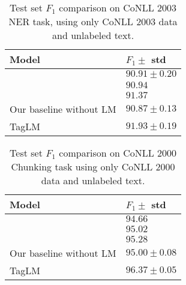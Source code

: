 \documentclass[11pt,a4paper]{article}
\begin{document}
\begin{table}[t]
\begin{center}
\begin{tabular}{l|l}
\hline \hline
\bf Model & \bf $F_1 \pm$ std \\ \hline
\citet{chiu-nichols-2016} & $90.91 \pm 0.20$ \\
\citet{lample-EtAl:2016:N16-1} & $90.94$ \\
\citet{Ma2016EndtoendSL} & $91.37$ \\
\hline
Our baseline without LM   & $90.87 \pm 0.13$  \\
TagLM & $\mathbf{91.93 \pm 0.19}$ \\
\hline \hline
\end{tabular}
\end{center}
\caption{\label{2003-table} Test set $F_1$ comparison on CoNLL 2003 NER task,
using only CoNLL 2003 data and unlabeled text.}
\end{table}



\begin{table}[t]
\begin{center}
\begin{tabular}{l|l}
\hline \hline
\bf Model & \bf $F_1 \pm$ std \\ \hline
\citet{yang-transfer-iclr07} & $94.66$ \\
\citet{joint-many-iclr07} & $95.02$ \\
\citet{Sgaard2016DeepML} & $95.28$ \\
\hline
Our baseline without LM   & $95.00 \pm 0.08$  \\
TagLM & $\mathbf{96.37 \pm 0.05}$ \\
\hline \hline
\end{tabular}
\end{center}
\caption{\label{2000-table} Test set $F_1$ comparison on CoNLL 2000 Chunking task using only CoNLL 2000 data and unlabeled text.}
\end{table}
\end{document}
